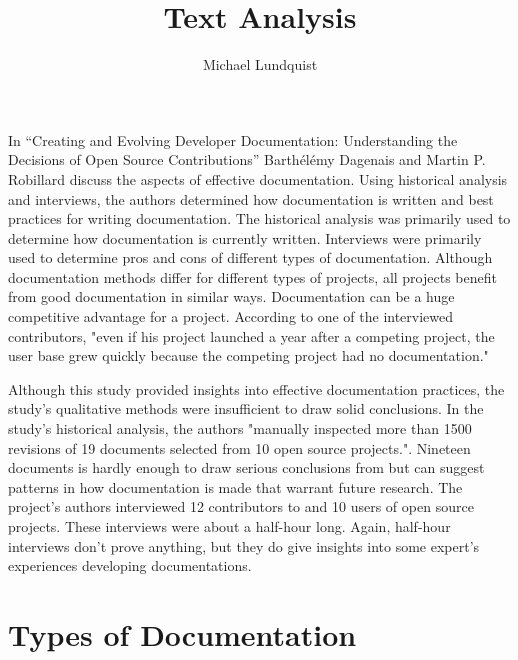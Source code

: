 \documentclass[titlepage]{article}
\author{Michael Lundquist}
\title{Text Analysis}
\begin{document}
\maketitle


\setlength{\bibleftmargin}{.125in}
\doublespacing

In “Creating and Evolving Developer Documentation: Understanding the Decisions of Open Source Contributions” Barthélémy Dagenais and Martin P. Robillard discuss the aspects of effective documentation. Using historical analysis and interviews, the authors determined how documentation is written and best practices for writing documentation. The historical analysis was primarily used to determine how documentation is currently written. Interviews were primarily used to determine pros and cons of different types of documentation. Although documentation methods differ for different types of projects, all projects benefit from good documentation in similar ways. Documentation can be a huge competitive advantage for a project. According to one of the interviewed contributors, "even if his project launched a year after a competing project, the user base grew quickly because the competing project had no documentation." \cite[p.6]{Dagenais:2010:CED:1882291.1882312}

Although this study provided insights into effective documentation practices, the study's qualitative methods were insufficient to draw solid conclusions. In the study's historical analysis, the authors "manually inspected more than 1500 revisions of 19 documents selected from 10 open source projects."\cite[p.1]{Dagenais:2010:CED:1882291.1882312}. Nineteen documents is hardly enough to draw serious conclusions from but can suggest patterns in how documentation is made that warrant future research. The project's authors interviewed 12 contributors to and 10 users of open source projects. These interviews were about a half-hour long. Again, half-hour interviews don't prove anything, but they do give insights into some expert's experiences developing documentations.

\section{Types of Documentation}
\end{document}
